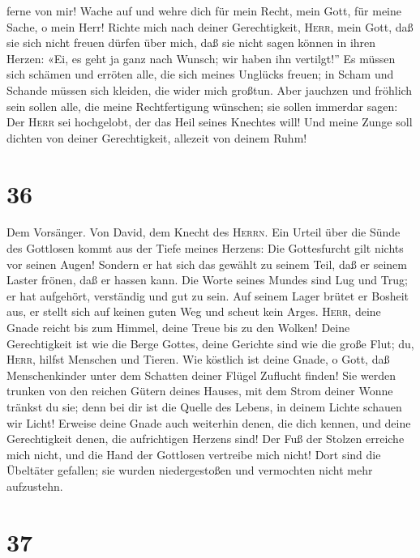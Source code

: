 ferne von mir!  Wache auf und wehre dich für mein Recht,
mein Gott, für meine Sache, o mein Herr!  Richte mich
nach deiner Gerechtigkeit, \textsc{Herr}, mein Gott, daß sie sich nicht
freuen dürfen über mich,  daß sie nicht sagen können in
ihren Herzen: «Ei, es geht ja ganz nach Wunsch; wir haben ihn
vertilgt!''  Es müssen sich schämen und erröten alle, die
sich meines Unglücks freuen; in Scham und Schande müssen sich kleiden,
die wider mich großtun.  Aber jauchzen und fröhlich sein
sollen alle, die meine Rechtfertigung wünschen; sie sollen immerdar
sagen: Der \textsc{Herr} sei hochgelobt, der das Heil seines Knechtes
will!  Und meine Zunge soll dichten von deiner
Gerechtigkeit, allezeit von deinem Ruhm!

\hypertarget{section-35}{%
\section{36}\label{section-35}}

 Dem Vorsänger. Von David, dem Knecht des \textsc{Herrn}.
Ein Urteil über die Sünde des Gottlosen kommt aus der Tiefe meines
Herzens: Die Gottesfurcht gilt nichts vor seinen Augen! 
Sondern er hat sich das gewählt zu seinem Teil, daß er seinem Laster
frönen, daß er hassen kann.  Die Worte seines Mundes sind
Lug und Trug; er hat aufgehört, verständig und gut zu sein.
 Auf seinem Lager brütet er Bosheit aus, er stellt sich
auf keinen guten Weg und scheut kein Arges. 
\textsc{Herr}, deine Gnade reicht bis zum Himmel, deine Treue bis zu den
Wolken!  Deine Gerechtigkeit ist wie die Berge Gottes,
deine Gerichte sind wie die große Flut; du, \textsc{Herr}, hilfst
Menschen und Tieren.  Wie köstlich ist deine Gnade, o
Gott, daß Menschenkinder unter dem Schatten deiner Flügel Zuflucht
finden!  Sie werden trunken von den reichen Gütern deines
Hauses, mit dem Strom deiner Wonne tränkst du sie;  denn
bei dir ist die Quelle des Lebens, in deinem Lichte schauen wir Licht!
 Erweise deine Gnade auch weiterhin denen, die dich
kennen, und deine Gerechtigkeit denen, die aufrichtigen Herzens sind!
 Der Fuß der Stolzen erreiche mich nicht, und die Hand
der Gottlosen vertreibe mich nicht!  Dort sind die
Übeltäter gefallen; sie wurden niedergestoßen und vermochten nicht mehr
aufzustehn.

\hypertarget{section-36}{%
\section{37}\label{section-36}}


